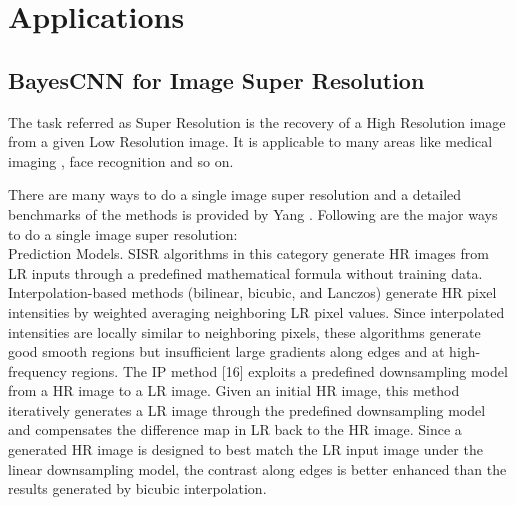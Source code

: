 \chapter{Applications}


\pagebreak



\section{BayesCNN for Image Super Resolution}

The task referred as Super Resolution is the recovery of a High Resolution image from a given Low Resolution image. It is applicable to many areas like medical imaging \citet{10.1007/978-3-642-40760-4_2}, face recognition \citet{1203152} and so on.

There are many ways to do a single image super resolution and a detailed benchmarks of the methods is provided by Yang \citet{Yang2014SingleImageSA}. Following are the major ways to do a single image super resolution:\\
Prediction Models. SISR algorithms in this category generate HR images
from LR inputs through a predefined mathematical formula without training
data. Interpolation-based methods (bilinear, bicubic, and Lanczos) generate HR pixel intensities by weighted averaging neighboring LR pixel values. Since interpolated intensities are locally similar to neighboring pixels, these algorithms generate good smooth regions but insufficient large gradients along edges and at high-frequency regions. The IP method [16] exploits a predefined downsampling model from a HR image to a LR image. Given an initial HR image, this method iteratively generates a LR image through the predefined downsampling model and compensates the difference map in LR back to the HR image. Since a generated HR image is designed to best match the LR input image under the linear downsampling model, the contrast along edges is better enhanced than the results generated by bicubic interpolation.\\

